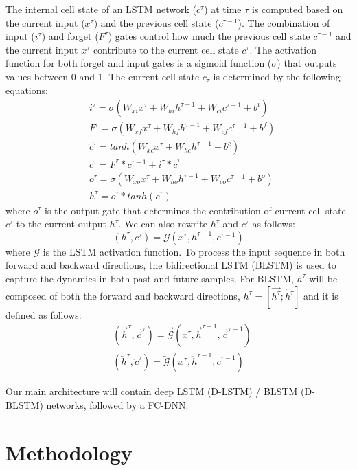 The internal cell state of an LSTM network ($c^{\tau}$) at time $\tau$ is computed based on the current input ($x^{\tau}$) and the previous cell state ($c^{\tau-1}$).
The combination of input ($i^{\tau}$) and forget ($F^{\tau}$) gates control how much the previous cell state $c^{\tau-1}$ and the current input $x^{\tau}$ contribute to the current cell state $c^{\tau}$.
The activation function for both forget and input gates is a sigmoid function ($\sigma$) that outputs values between 0 and 1. The current cell state  $c_\tau$ is determined by the following equations: 
\begin{align}
& i^\tau = \sigma(W_{xi} x^\tau + W_{hi} h^{\tau-1} + W_{ci} c^{\tau-1} + b^i) \\ 
& F^\tau = \sigma(W_{xf} x^\tau + W_{hf} h^{\tau-1} + W_{cf} c^{\tau-1} + b^f) \\ 
& \tilde{c}^{\tau} = tanh(W_{xc} x^{\tau} + W_{hc} h^{\tau-1} + b^c) \\ 
& c^{\tau} = F^\tau * c^{\tau-1} + i^{\tau} * \tilde{c}^\tau\\
& o^\tau = \sigma(W_{xo} x^\tau + W_{ho} h^{\tau-1} + W_{co} c^{\tau-1} + b^o) \\ 
& h^\tau = o^\tau * tanh(c^\tau) 
\end{align}
where $o^\tau$ is the output gate that determines the contribution of  current cell state $c^\tau$ to the current output $h^\tau$. We can also rewrite $h^\tau$ and $c^\tau$ as follows:
\[
(h^\tau, c^\tau) = \mathcal{G}(x^\tau, h^{\tau-1}, c^{\tau-1})
\]
where $\mathcal{G}$ is the LSTM activation function. 
To process the input sequence in both forward and backward directions, the bidirectional LSTM (BLSTM) is used to capture the dynamics in both past and future samples.
For BLSTM, $h^\tau$ will be composed of both the forward and backward directions, $h^\tau = [\overrightarrow{h^\tau}; \overleftarrow{h^\tau}]$ and it is defined as follows:
\begin{align}
& (\overrightarrow{h}^\tau, \overrightarrow{c}^\tau) = \overrightarrow{\mathcal{G}}(x^\tau, \overrightarrow{h}^{\tau-1}, \overrightarrow{c}^{\tau-1}) \\
& (\overleftarrow{h}^\tau, \overleftarrow{c}^\tau) = \overleftarrow{\mathcal{G}}(x^\tau, \overleftarrow{h}^{\tau-1}, \overleftarrow{c}^{\tau-1})
\end{align}

Our main architecture will contain deep LSTM (D-LSTM) / BLSTM (D-BLSTM) networks, followed by a FC-DNN. 


\newpage
\chapter{Methodology}
\label{methodology}

